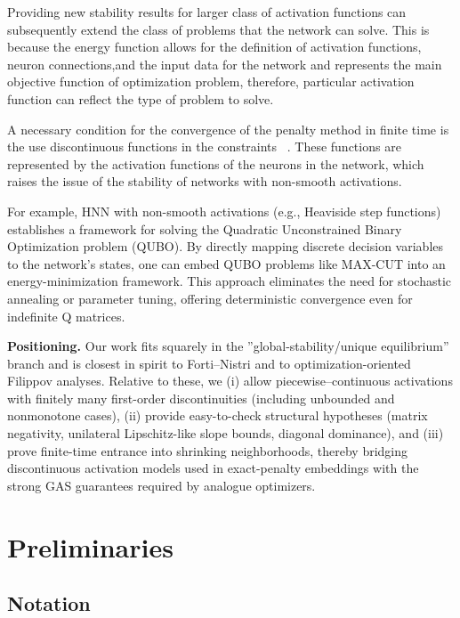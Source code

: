 \documentclass[journal]{IEEEtran}
\begin{document}
Providing new stability results for larger class of activation functions can subsequently extend the class of problems that the network can solve. This is because the energy function allows for the definition of activation functions, neuron connections,and the input data for the network and represents the main objective function of optimization problem, therefore, particular activation function can reflect the type of problem to solve.

A necessary condition for the convergence of the penalty method in finite time is the use discontinuous functions in the constraints ~\cite{517}. These functions are represented by the activation functions of the neurons in the network, which raises the issue of the stability of networks with non-smooth activations.

For example, HNN with non-smooth activations (e.g., Heaviside step functions) establishes a framework for solving the Quadratic Unconstrained Binary Optimization problem (QUBO). By directly mapping discrete decision variables to the network’s states, one can embed QUBO problems like MAX-CUT into an energy-minimization framework. This approach eliminates the need for stochastic annealing or parameter tuning, offering deterministic convergence
even for indefinite Q matrices.

\textbf{Positioning.}
Our work fits squarely in the ''global-stability/unique equilibrium'' branch 
and is closest in spirit to Forti–Nistri and to optimization-oriented Filippov analyses. 
Relative to these, we 
(i) allow piecewise–continuous activations with finitely many first-order discontinuities 
(including unbounded and nonmonotone cases), 
(ii) provide easy-to-check structural hypotheses (matrix negativity, unilateral Lipschitz-like slope bounds, 
diagonal dominance), and 
(iii) prove finite-time entrance into shrinking neighborhoods, thereby bridging discontinuous activation models 
used in exact-penalty embeddings with the strong GAS guarantees required by analogue optimizers.

\section{Preliminaries}\label{sec:prelim}
\subsection{Notation}
\end{document}
